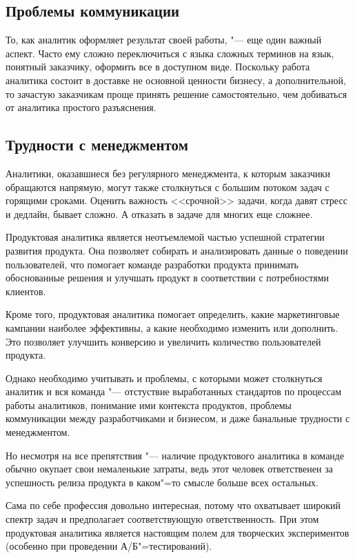 \documentclass[referat, times]{SCWorks}
\begin{document}
\subsection{Проблемы коммуникации}
То, как аналитик оформляет результат своей работы, "--- еще один важный аспект. Часто ему сложно переключиться с языка сложных терминов на язык, понятный заказчику, оформить все в доступном виде. Поскольку работа аналитика состоит в доставке не основной ценности бизнесу, а дополнительной, то зачастую заказчикам проще принять решение самостоятельно, чем добиваться от аналитика простого разъяснения.

\subsection{Трудности с менеджментом}
Аналитики, оказавшиеся без регулярного менеджмента, к которым заказчики обращаются напрямую, могут также столкнуться с большим потоком задач с горящими сроками. Оценить важность <<срочной>> задачи, когда давят стресс и дедлайн, бывает сложно. А отказать в задаче для многих еще сложнее\cite{pilyavskaya}.



\conclusion
Продуктовая аналитика является неотъемлемой частью успешной стратегии развития продукта. Она позволяет собирать и анализировать данные о поведении пользователей, что помогает команде разработки продукта принимать обоснованные решения и улучшать продукт в соответствии с потребностями клиентов.

Кроме того, продуктовая аналитика помогает определить, какие маркетинговые кампании наиболее эффективны, а какие необходимо изменить или дополнить. Это позволяет улучшить конверсию и увеличить количество пользователей продукта.

Однако необходимо учитывать и проблемы, с которыми может столкнуться аналитик и вся команда "--- отстуствие выработанных стандартов по процессам работы аналитиков, понимание ими контекста продуктов, проблемы коммуникации между разработчиками и бизнесом, и даже банальные трудности с менеджментом.

Но несмотря на все препятствия "--- наличие продуктового аналитика в команде обычно окупает свои немаленькие затраты, ведь этот человек ответственен за успешность релиза продукта в каком"=то смысле больше всех остальных. 

Сама по себе профессия довольно интересная, потому что охватывает широкий спектр задач и предполагает соответствующую ответственность. При этом продуктовая аналитика является настоящим полем для творческих экспериментов (особенно при проведении А/Б"=тестирований).  

\nocite{*}




\appendix
\end{document}
